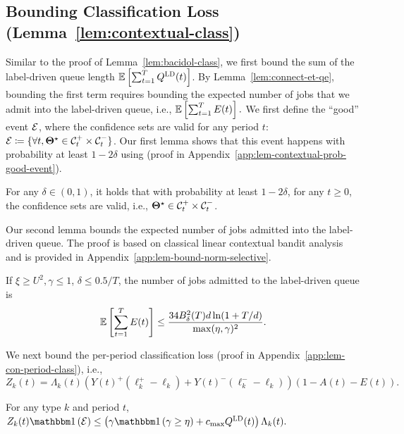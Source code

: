 \subsection{Bounding Classification Loss (Lemma~\ref{lem:contextual-class})}
Similar to the proof of Lemma~\ref{lem:bacidol-class}, we first bound the sum of the label-driven queue length $\mathbb E\left[\sum_{t=1}^T Q^{\mathcal{\textsc{LD}}}(t)\right]$. By Lemma~\ref{lem:connect-et-qe}, bounding the first term requires bounding the expected number of jobs that we admit into the label-driven queue, i.e., $\mathbb E\left[\sum_{t=1}^T E(t)\right].$ We first define the ``good'' event $\mathcal{E}$, where the confidence sets are valid for any period $t$: $\mathcal{E} \coloneqq \{\forall t, \boldsymbol{\Theta}^\star \in \mathcal{C}_t^+ \times \mathcal{C}_t^-\}$. Our first lemma shows that this event happens with probability at least $1-2\delta$ using \cite[Theorem~2]{Abbasi-YadkoriPS11} (proof in Appendix~\ref{app:lem-contextual-prob-good-event}).
\begin{lemma}\label{lem:contextual-prob-good-event}
For any $\delta \in (0,1)$, it holds that with probability at least $1-2\delta$, for any $t \geq 0$, the confidence sets are valid, i.e., $\boldsymbol{\Theta}^\star \in \mathcal{C}_t^+ \times \mathcal{C}_t^-$.
\end{lemma}
Our second lemma bounds the expected number of jobs admitted into the label-driven queue. The proof is based on classical linear contextual bandit analysis and is provided in Appendix~\ref{app:lem-bound-norm-selective}.
\begin{lemma}\label{lem:bound-norm-selective}
If $\xi \geq U^2, \gamma \leq 1$, $\delta \leq 0.5/T$, the number of jobs admitted to the label-driven queue is  \[\mathbb E\left[\sum_{t=1}^T E(t)\right] \leq \frac{34B_{\delta}^2(T)d\ln(1+T/d)}{\max(\eta,\gamma)^2}.\]
\end{lemma}
We next bound the per-period classification loss (proof in Appendix~\ref{app:lem-con-period-class}), i.e.,
\[
Z_k(t) = \Lambda_k(t)(Y(t)^+(\ell_k^+ - \ell_k) + Y(t)^-(\ell_k^- -\ell_k))(1-A(t)-E(t)).\]
\begin{lemma}\label{lem:con-period-class}
For any type $k$ and period $t$, $Z_k(t)\indic{\set{E}} \leq \left(\gamma\indic{\gamma \geq \eta} + c_{\max}Q^{\ld}(t)\right)\Lambda_k(t).$
\end{lemma}

